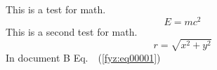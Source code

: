 \documentclass{scrbook}
\begin{document}
  \shorthandoff{-}
  
  \frontmatter
    
    \tableofcontents
  \mainmatter 
    \setcounter{page}{3} 

    This is a test for math.
    \begin{equation}
        E=mc^2 \label{mai:eq00001}
    \end{equation}
    This is a second test for math.
    \begin{equation}
        r = \sqrt{x^2 + y^2} \label{mai:eq00002}
    \end{equation}
    In document B Eq.~~(\ref{fyz:eq00001}) 

    
  \backmatter
\end{document}
